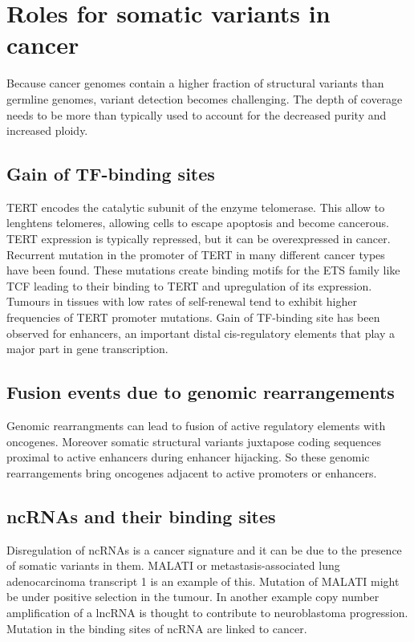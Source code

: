 \section{Roles for somatic variants in cancer}
Because cancer genomes contain a higher fraction of structural variants than germline genomes, variant detection becomes challenging.
The depth of coverage needs to be more than typically used to account for the decreased purity and increased ploidy.

	\subsection{Gain of TF-binding sites}
	TERT encodes the catalytic subunit of the enzyme telomerase.
	This allow to lenghtens telomeres, allowing cells to escape apoptosis and become cancerous.
	TERT expression is typically repressed, but it can be overexpressed in cancer.
	Recurrent mutation in the promoter of TERT in many different cancer types have been found.
	These mutations create binding motifs for the ETS family like TCF leading to their binding to TERT and upregulation of its expression.
	Tumours in tissues with low rates of self-renewal tend to exhibit higher frequencies of TERT promoter mutations.
	Gain of TF-binding site has been observed for enhancers, an important distal cis-regulatory elements that play a major part in gene transcription.

	\subsection{Fusion events due to genomic rearrangements}
	Genomic rearrangments can lead to fusion of active regulatory elements with oncogenes.
	Moreover somatic structural variants juxtapose coding sequences proximal to active enhancers during enhancer hijacking.
	So these genomic rearrangements bring oncogenes adjacent to active promoters or enhancers.

	\subsection{ncRNAs and their binding sites}
	Disregulation of ncRNAs is a cancer signature and it can be due to the presence of somatic variants in them.
	MALATI or metastasis-associated lung adenocarcinoma transcript 1 is an example of this.
	Mutation of MALATI might be under positive selection in the tumour.
	In another example copy number amplification of a lncRNA is thought to contribute to neuroblastoma progression.
	Mutation in the binding sites of ncRNA are linked to cancer.

